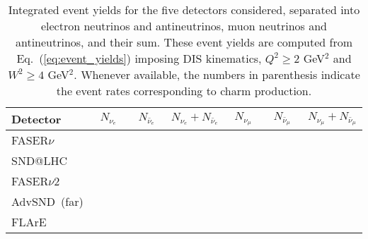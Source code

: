 \begin{table}[t]
  \centering
  \small
  \renewcommand{\arraystretch}{1.70}
\begin{tabularx}{\textwidth}{X|c|c|c|c|c|c}
\toprule
Detector & $\quad$ $N_{\nu_e}$ $\quad$ &$\quad$ $N_{\bar{\nu}_e}$$\quad$   &   $N_{\nu_e} + N_{\bar{\nu}_e}$ &
$\quad$$N_{\nu_\mu}$ $\quad$ & $\quad$ $N_{\bar{\nu}_\mu}$ $\quad$  &   $N_{\nu_\mu} + N_{\bar{\nu}_\mu}$ \\
\midrule
\midrule
FASER$\nu$  &    &    &   &   &    &    \\
SND@LHC  &    &    &   &   &    &    \\
\midrule
\midrule
FASER$\nu$2  &    &    &   &   &    &    \\
AdvSND~(far)  &    &    &   &   &    &    \\
FLArE &    &    &   &   &    &    \\
  \bottomrule
\end{tabularx}
\vspace{0.2cm}
\caption{\small Integrated event yields for the five detectors considered,
  separated into electron neutrinos and antineutrinos,
  muon neutrinos and antineutrinos, and their sum.
  These event yields are computed from Eq.~(\ref{eq:event_yields})
  imposing DIS kinematics, $Q^2 \ge 2$ GeV$^2$ and $W^2 \ge 4$ GeV$^2$.
  Whenever available, the
  numbers in parenthesis indicate the event rates corresponding to charm
  production.
  \label{tab:integrated_rates}
}
\end{table}
